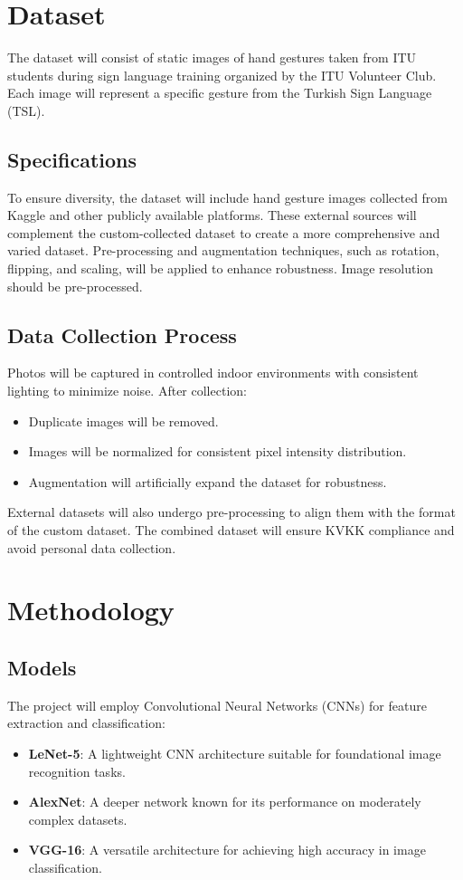 \documentclass[conference]{IEEEtran}
\begin{document}
\section{Dataset}
The dataset will consist of static images of hand gestures taken from ITU students during sign language training organized by the ITU Volunteer Club. Each image will represent a specific gesture from the Turkish Sign Language (TSL). 

\subsection{Specifications}
To ensure diversity, the dataset will include hand gesture images collected from Kaggle and other publicly available platforms. These external sources will complement the custom-collected dataset to create a more comprehensive and varied dataset. Pre-processing and augmentation techniques, such as rotation, flipping, and scaling, will be applied to enhance robustness. Image resolution should be pre-processed.

\subsection{Data Collection Process}
Photos will be captured in controlled indoor environments with consistent lighting to minimize noise. After collection:
\begin{itemize}
    \item Duplicate images will be removed.
    \item Images will be normalized for consistent pixel intensity distribution.
    \item Augmentation will artificially expand the dataset for robustness.
\end{itemize}
External datasets will also undergo pre-processing to align them with the format of the custom dataset. The combined dataset will ensure KVKK compliance and avoid personal data collection.

\section{Methodology}
\subsection{Models}
The project will employ Convolutional Neural Networks (CNNs) for feature extraction and classification:
\begin{itemize}
    \item \textbf{LeNet-5}: A lightweight CNN architecture suitable for foundational image recognition tasks.
    \item \textbf{AlexNet}: A deeper network known for its performance on moderately complex datasets.
    \item \textbf{VGG-16}: A versatile architecture for achieving high accuracy in image classification.
\end{itemize}
\end{document}
